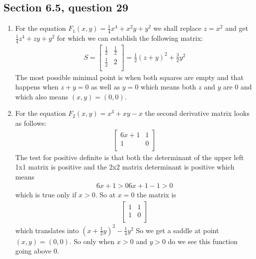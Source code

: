 \documentclass[a4paper,11pt]{article}
\newcommand{\?}{\stackrel{?}{=}}
\begin{document}
\subsection*{Section 6.5, question 29}
\begin{enumerate}
\item
For the equation $F_1(x,y)=\frac{1}{4}x^4+x^2y+y^2$ we shall replace $z=x^2$ and get $\frac{1}{4}z^4+zy+y^2$ for which we can establish the following matrix:
\begin{align*}
S = 
\begin{bmatrix}
\frac{1}{2} & \frac{1}{2} \\
\frac{1}{2} & 2 \\
\end{bmatrix}
=
\frac{1}{2}(z+y)^2+\frac{3}{2}y^2
\end{align*}
The most possible minimal point is when both squares are empty and that happens when $z+y=0$ as well as $y=0$ which means both $z$ and $y$ are 0 and which also means $(x,y)=(0,0)$.
\item
For the equation $F_2(x,y)=x^3+xy-x$ the second derivative matrix looks as follows:
\begin{align*}
\begin{bmatrix}
6x+1 & 1 \\
1 & 0 \\
\end{bmatrix}
\end{align*}
The test for positive definite is that both the determinant of the upper left 1x1 matrix is positive and the 2x2 matrix determinant is positive which means
\begin{align*}
6x+1>0
6x+1-1>0
\end{align*}
which is true only if $x>0$.
So at $x=0$ the matrix is 
\begin{align*}
\begin{bmatrix}
1 & 1 \\
1 & 0 \\
\end{bmatrix}
\end{align*}
which translates into $(x+\frac{1}{2}y)^2-\frac{1}{4}y^2$
So we get a saddle at point $(x,y)=(0,0)$.
So only when $x>0$ and $y>0$ do we see this function going above 0.
\end{enumerate}
\end{document}
